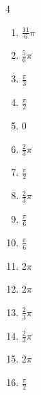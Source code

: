 \begin{multicols}{4}
\begin{enumerate}
  \item $\displaystyle \frac{11}{6}\pi$

  \item $\displaystyle \frac{5}{6}\pi$

  \item $\displaystyle \frac{\pi}{3}$

  \item $\displaystyle \frac{\pi}{2}$

  \item $\displaystyle 0$

  \item $\displaystyle \frac{2}{3}\pi$

  \item $\displaystyle \frac{\pi}{2}$

  \item $\displaystyle \frac{2}{3}\pi$

  \item $\displaystyle \frac{\pi}{6}$

  \item $\displaystyle \frac{\pi}{6}$

  \item $\displaystyle 2\pi$

\columnbreak %

  \item $\displaystyle 2\pi$

  \item $\displaystyle \frac{2}{3}\pi$

  \item $\displaystyle \frac{2}{3}\pi$

  \item $\displaystyle 2\pi$

  \item $\displaystyle \frac{\pi}{2}$


\end{enumerate}
\end{multicols}

